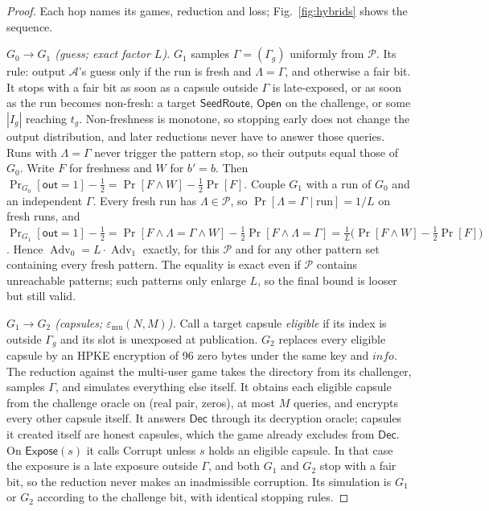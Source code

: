 \documentclass[pdflatex,sn-mathphys-num,twocolumn]{sn-jnl}
\theoremstyle{plain}
\theoremstyle{definition}
\newcommand{\Adv}{\operatorname{Adv}}
\begin{document}
\begin{proof}
Each hop names its games, reduction and loss; Fig.~\ref{fig:hybrids} shows the sequence.

\emph{$G_0\to G_1$ (guess; exact factor $L$).} $G_1$ samples $\Gamma=(\Gamma_g)$ uniformly from $\mathcal P$. Its rule: output $\mathcal A$'s guess only if the run is fresh and $\Lambda=\Gamma$, and otherwise a fair bit. It stops with a fair bit as soon as a capsule outside $\Gamma$ is late-exposed, or as soon as the run becomes non-fresh: a target $\mathsf{SeedRoute}$, $\mathsf{Open}$ on the challenge, or some $|I_g|$ reaching $t_g$. Non-freshness is monotone, so stopping early does not change the output distribution, and later reductions never have to answer those queries. Runs with $\Lambda=\Gamma$ never trigger the pattern stop, so their outputs equal those of $G_0$. Write $F$ for freshness and $W$ for $b'=b$. Then $\Pr_{G_0}[\mathsf{out}=1]-\tfrac12=\Pr[F\wedge W]-\tfrac12\Pr[F]$. Couple $G_1$ with a run of $G_0$ and an independent $\Gamma$. Every fresh run has $\Lambda\in\mathcal P$, so $\Pr[\Lambda=\Gamma\mid\text{run}]=1/L$ on fresh runs, and
$\Pr_{G_1}[\mathsf{out}=1]-\tfrac12=\Pr[F\wedge\Lambda{=}\Gamma\wedge W]-\tfrac12\Pr[F\wedge\Lambda{=}\Gamma]=\tfrac1L\big(\Pr[F\wedge W]-\tfrac12\Pr[F]\big)$.
Hence $\Adv_0=L\cdot\Adv_1$ exactly, for this $\mathcal P$ and for any other pattern set containing every fresh pattern. The equality is exact even if $\mathcal P$ contains unreachable patterns; such patterns only enlarge $L$, so the final bound is looser but still valid.

\emph{$G_1\to G_2$ (capsules; $\varepsilon_{\mathrm{mu}}(N,M)$).} Call a target capsule \emph{eligible} if its index is outside $\Gamma_g$ and its slot is unexposed at publication. $G_2$ replaces every eligible capsule by an HPKE encryption of 96 zero bytes under the same key and $\mathit{info}$. The reduction against the multi-user game takes the directory from its challenger, samples $\Gamma$, and simulates everything else itself. It obtains each eligible capsule from the challenge oracle on (real pair, zeros), at most $M$ queries, and encrypts every other capsule itself. It answers $\mathsf{Dec}$ through its decryption oracle; capsules it created itself are honest capsules, which the game already excludes from $\mathsf{Dec}$. On $\mathsf{Expose}(s)$ it calls Corrupt unless $s$ holds an eligible capsule. In that case the exposure is a late exposure outside $\Gamma$, and both $G_1$ and $G_2$ stop with a fair bit, so the reduction never makes an inadmissible corruption. Its simulation is $G_1$ or $G_2$ according to the challenge bit, with identical stopping rules.


\end{proof}
\end{document}
